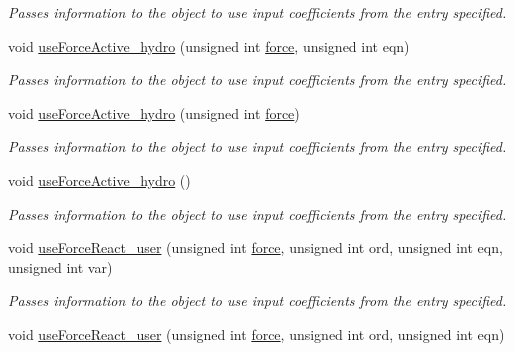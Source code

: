 \begin{DoxyCompactItemize}
\begin{DoxyCompactList}\small\item\em Passes information to the object to use input coefficients from the entry specified. \end{DoxyCompactList}\item 
void \hyperlink{classosea_1_1ofreq_1_1_motion_model_a4d3e0590135e1a9f7ce954406f99ff44}{use\-Force\-Active\-\_\-hydro} (unsigned int \hyperlink{input__syntax_8dox_ab0a92c70357da47fe86696522eab7dc8}{force}, unsigned int eqn)
\begin{DoxyCompactList}\small\item\em Passes information to the object to use input coefficients from the entry specified. \end{DoxyCompactList}\item 
void \hyperlink{classosea_1_1ofreq_1_1_motion_model_a59ac49cac82e8214a2e1420e2f02736b}{use\-Force\-Active\-\_\-hydro} (unsigned int \hyperlink{input__syntax_8dox_ab0a92c70357da47fe86696522eab7dc8}{force})
\begin{DoxyCompactList}\small\item\em Passes information to the object to use input coefficients from the entry specified. \end{DoxyCompactList}\item 
void \hyperlink{classosea_1_1ofreq_1_1_motion_model_afe1c219c16bd1b3eb63f49065872cec6}{use\-Force\-Active\-\_\-hydro} ()
\begin{DoxyCompactList}\small\item\em Passes information to the object to use input coefficients from the entry specified. \end{DoxyCompactList}\item 
void \hyperlink{classosea_1_1ofreq_1_1_motion_model_a7db1d1ebebe216d17efd7b38f2e9deec}{use\-Force\-React\-\_\-user} (unsigned int \hyperlink{input__syntax_8dox_ab0a92c70357da47fe86696522eab7dc8}{force}, unsigned int ord, unsigned int eqn, unsigned int var)
\begin{DoxyCompactList}\small\item\em Passes information to the object to use input coefficients from the entry specified. \end{DoxyCompactList}\item 
void \hyperlink{classosea_1_1ofreq_1_1_motion_model_a26352f59cd049a551ff692c5feb0b387}{use\-Force\-React\-\_\-user} (unsigned int \hyperlink{input__syntax_8dox_ab0a92c70357da47fe86696522eab7dc8}{force}, unsigned int ord, unsigned int eqn)

\end{DoxyCompactItemize}
